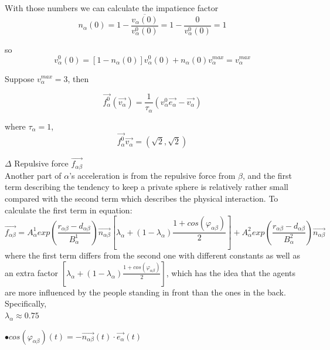 With those numbers we can calculate the impatience factor 
 \begin{equation}
 n_{\alpha}(0)=1-\frac{\overline{v_{\alpha}(0)}}{v^{0}_{\alpha}(0)}=1-\dfrac{0}{v^{0}_{\alpha}(0)}=1
 \end{equation}

so 
 \begin{equation}
 v^{0}_{\alpha}(0)=[1-n_{\alpha}(0)]v^{0}_{\alpha}(0) + n_{\alpha}(0)v_{\alpha}^{max} = v_{\alpha}^{max}
 \end{equation}
 
Suppose $v_{\alpha}^{max}=3$, then 

 \begin{equation}
 	\vec{f^{0}_{\alpha}} \left( \vec{v_{\alpha}} \right) 
= 	\frac{1}{\tau_{\alpha}} \left( v^{0}_{\alpha} 
	\vec{e_{\alpha}} - \vec{v_{\alpha}} \right)
 \end{equation}
 
where $\tau_{\alpha}=1$,
 \begin{equation}
 \overrightarrow{f^{0}_{\alpha}}\overrightarrow{v_{\alpha}} = (\sqrt{2}, \sqrt{2})
 \end{equation}

$\Delta$ Repulsive force $ \overrightarrow{f_{\alpha\beta}} $\\

Another part of $\alpha$'s acceleration is from the repulsive force from $\beta$, and the first term describing the tendency to keep a private sphere is relatively rather small compared with the second term which describes the physical interaction.
To calculate the first term in equation:
 \begin{equation}
\overrightarrow{f_{\alpha\beta}}=A^{1}_{\alpha} exp(\frac{r_{\alpha\beta}-d_{\alpha\beta}}{B^{1}_{\alpha}})\overrightarrow{n_{\alpha \beta}}\left[ \lambda_{\alpha} +(1-\lambda_{\alpha})\frac{1+cos(\varphi_{\alpha\beta})}{2}\right]+ A^{2}_{\alpha}exp(\frac{r_{\alpha\beta}-d_{\alpha\beta}}{B^{2}_{\alpha}})\overrightarrow{n_{\alpha\beta}}
 \end{equation}
where the first term differs from the second one with different constants as well as an extra factor $ \left[ \lambda_{\alpha} +(1-\lambda_{\alpha})\frac{1+cos(\varphi_{\alpha\beta})}{2}\right] $, which has the idea that the agents are more influenced by the people standing in front than the ones in the back. Specifically, \\

$\lambda_{\alpha} \approx 0.75$

$\bullet cos(\varphi_{\alpha\beta})(t)= -\overrightarrow{n_{\alpha \beta}}(t)\cdot\overrightarrow{e_{\alpha}}(t)$\\

